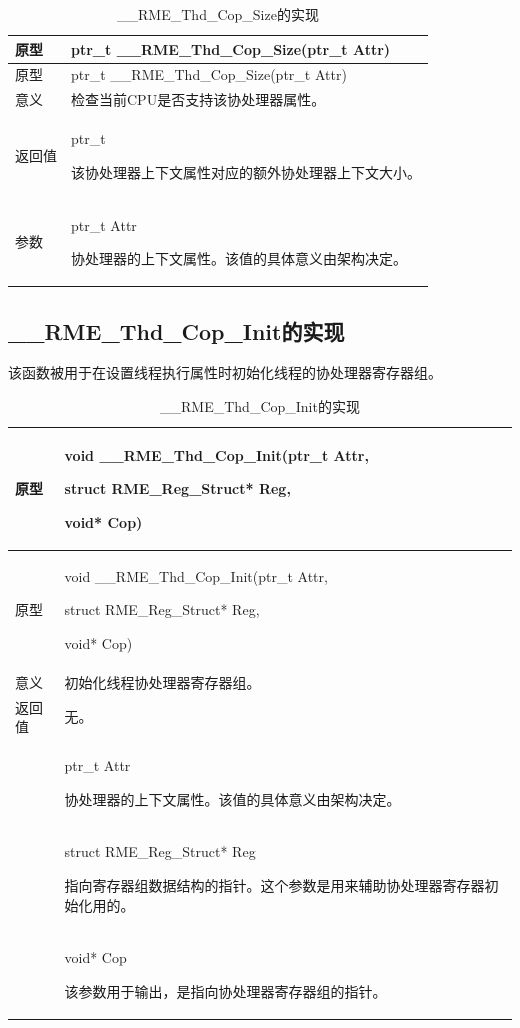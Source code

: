 \begin{xltabular}{\textwidth}{@{}>{\hsize\raggedright\arraybackslash}X>{\hsize\raggedright\arraybackslash}X@{}}
\caption{\_\_RME\_Thd\_Cop\_Size的实现}\label{tab:7-70-rme-thd-cop-size-implementation}\\
\toprule
原型 & ptr\_t \_\_RME\_Thd\_Cop\_Size(ptr\_t Attr)\tabularnewline
\endfirsthead
\toprule
原型 & ptr\_t \_\_RME\_Thd\_Cop\_Size(ptr\_t Attr)\tabularnewline
\midrule
\endhead
\bottomrule
\endlastfoot
意义 & 检查当前CPU是否支持该协处理器属性。\tabularnewline
返回值\strut
 & ptr\_t

该协处理器上下文属性对应的额外协处理器上下文大小。\strut
\tabularnewline
参数\strut
 & ptr\_t Attr

协处理器的上下文属性。该值的具体意义由架构决定。\strut
\tabularnewline
\end{xltabular}

\subsection{\_\_RME\_Thd\_Cop\_Init的实现}\label{subsec:7-rme-thd-cop-init-implementation}

该函数被用于在设置线程执行属性时初始化线程的协处理器寄存器组。

\begin{xltabular}{\textwidth}{@{}>{\hsize\raggedright\arraybackslash}X>{\hsize\raggedright\arraybackslash}X@{}}
\caption{\_\_RME\_Thd\_Cop\_Init的实现}\label{tab:7-71-rme-thd-cop-init-implementation}\\
\toprule
原型\strut
 & void \_\_RME\_Thd\_Cop\_Init(ptr\_t Attr,

struct RME\_Reg\_Struct* Reg,

void* Cop)\strut
\tabularnewline
\endfirsthead
\toprule
原型\strut
 & void \_\_RME\_Thd\_Cop\_Init(ptr\_t Attr,

struct RME\_Reg\_Struct* Reg,

void* Cop)\strut
\tabularnewline
\midrule
\endhead
\bottomrule
\endlastfoot
意义 & 初始化线程协处理器寄存器组。\tabularnewline
返回值 & 无。\tabularnewline
{} & ptr\_t Attr

协处理器的上下文属性。该值的具体意义由架构决定。\strut
\tabularnewline
\strut
 & struct RME\_Reg\_Struct* Reg

指向寄存器组数据结构的指针。这个参数是用来辅助协处理器寄存器初始化用的。\strut
\tabularnewline
\strut
 & void* Cop

该参数用于输出，是指向协处理器寄存器组的指针。\strut
\tabularnewline
\end{xltabular}

